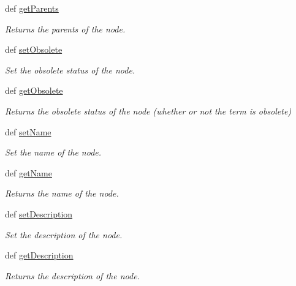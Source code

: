 \begin{DoxyCompactItemize}
def \hyperlink{class_g_o_node_1_1_g_o_node_adf49ff024c6b5cade07995c56256d9dd}{getParents}
\begin{DoxyCompactList}\small\item\em Returns the parents of the node. \item\end{DoxyCompactList}\item 
def \hyperlink{class_g_o_node_1_1_g_o_node_a038f04eff9f5d8486280bc70887515fa}{setObsolete}
\begin{DoxyCompactList}\small\item\em Set the obsolete status of the node. \item\end{DoxyCompactList}\item 
def \hyperlink{class_g_o_node_1_1_g_o_node_ac965c13905434899a4c88f931f33e640}{getObsolete}
\begin{DoxyCompactList}\small\item\em Returns the obsolete status of the node (whether or not the term is obsolete) \item\end{DoxyCompactList}\item 
def \hyperlink{class_g_o_node_1_1_g_o_node_ab48dc024009773f22884b5a7c75d17cd}{setName}
\begin{DoxyCompactList}\small\item\em Set the name of the node. \item\end{DoxyCompactList}\item 
def \hyperlink{class_g_o_node_1_1_g_o_node_a00e15671c0ef26e70eda632da8518ee9}{getName}
\begin{DoxyCompactList}\small\item\em Returns the name of the node. \item\end{DoxyCompactList}\item 
def \hyperlink{class_g_o_node_1_1_g_o_node_a6da2fec8371255c0728c3bed095ab4f9}{setDescription}
\begin{DoxyCompactList}\small\item\em Set the description of the node. \item\end{DoxyCompactList}\item 
def \hyperlink{class_g_o_node_1_1_g_o_node_acaadece0d9dc2efabf97c71dd438de6f}{getDescription}
\begin{DoxyCompactList}\small\item\em Returns the description of the node. \item\end{DoxyCompactList}\end{DoxyCompactItemize}

